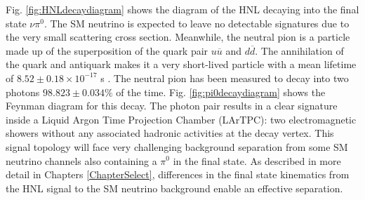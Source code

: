 Fig. \ref{fig:HNLdecaydiagram} shows the diagram of the HNL decaying into the final state $\nu\pi^0$.
The SM neutrino is expected to leave no detectable signatures due to the very small scattering cross section.
Meanwhile, the neutral pion is a particle made up of the superposition of the quark pair $u\overline{u}$ and $d\overline{d}$. 
The annihilation of the quark and antiquark makes it a very short-lived particle with a mean lifetime of $8.52\pm0.18 \times 10^{-17}$ s \cite{PDG}.
The neutral pion has been measured to decay into two photons $98.823 \pm 0.034 \%$ of the time. 
Fig. \ref{fig:pi0decaydiagram} shows the Feynman diagram for this decay.
The photon pair results in a clear signature inside a Liquid Argon Time Projection Chamber (LArTPC): two electromagnetic showers without any associated hadronic activities at the decay vertex.
This signal topology will face very challenging background separation from some SM neutrino channels also containing a $\pi^0$ in the final state.
As described in more detail in Chapters \ref{ChapterSelect}, differences in the final state kinematics from the HNL signal to the SM neutrino background enable an effective separation.



